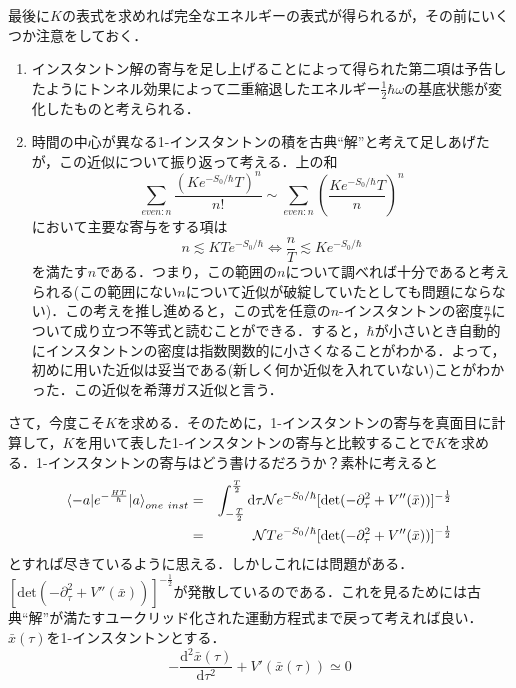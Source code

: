 \documentclass[a4paper,11pt]{jsarticle}
\begin{document}
最後に$K$の表式を求めれば完全なエネルギーの表式が得られるが，その前にいくつか注意をしておく．
\begin{enumerate}
\renewcommand{\labelenumi}{(\roman{enumi})}
\item インスタントン解の寄与を足し上げることによって得られた第二項は予告したようにトンネル効果によって二重縮退したエネルギー$\frac{1}{2}\hbar\omega$の基底状態が変化したものと考えられる．
\item 時間の中心が異なる1-インスタントンの積を古典``解''と考えて足しあげたが，この近似について振り返って考える．上の和
\begin{equation*}
\sum_{even:n}\frac{(Ke^{-S_0/\hbar}T)^n}{n!}\sim\sum_{even:n}\left(\frac{Ke^{-S_0/\hbar}T}{n}\right)^n
\end{equation*}
において主要な寄与をする項は
\begin{equation*}
n\lesssim KTe^{-S_0/\hbar} \Longleftrightarrow \frac{n}{T}\lesssim Ke^{-S_0/\hbar}
\end{equation*}
を満たす$n$である．つまり，この範囲の$n$について調べれば十分であると考えられる(この範囲にない$n$について近似が破綻していたとしても問題にならない)．この考えを推し進めると，この式を任意の$n$-インスタントンの密度$\frac{n}{T}$について成り立つ不等式と読むことができる．すると，$\hbar$が小さいとき自動的にインスタントンの密度は指数関数的に小さくなることがわかる．よって，初めに用いた近似は妥当である(新しく何か近似を入れていない)ことがわかった．この近似を希薄ガス近似と言う．
\end{enumerate}
さて，今度こそ$K$を求める．そのために，1-インスタントンの寄与を真面目に計算して，$K$を用いて表した1-インスタントンの寄与と比較することで$K$を求める．1-インスタントンの寄与はどう書けるだろうか？素朴に考えると
\begin{eqnarray*}
\braket{-a|e^{-\frac{HT}{\hbar}}|a}_{one{\ }inst}&=&\int_{-\frac{T}{2}}^{\frac{T}{2}}\mathrm{d}\tau\mathcal{N}e^{-S_0/\hbar}[\mathrm{det}(-\partial_\tau^2+V''(\bar{x}))]^{-\frac{1}{2}} \\
&=&\mathcal{N}Te^{-S_0/\hbar}[\mathrm{det}(-\partial_\tau^2+V''(\bar{x}))]^{-\frac{1}{2}}
\end{eqnarray*}
とすれば尽きているように思える．しかしこれには問題がある．$[\mathrm{det}(-\partial_\tau^2+V''(\bar{x}))]^{-\frac{1}{2}}$が発散しているのである．これを見るためには古典``解''が満たすユークリッド化された運動方程式まで戻って考えれば良い．$\bar{x}(\tau)$を1-インスタントンとする．
\begin{equation*}
-\frac{\mathrm{d}^2\bar{x}(\tau)}{\mathrm{d}\tau^2}+V'(\bar{x}(\tau))\simeq 0
\end{equation*}
\end{document}
